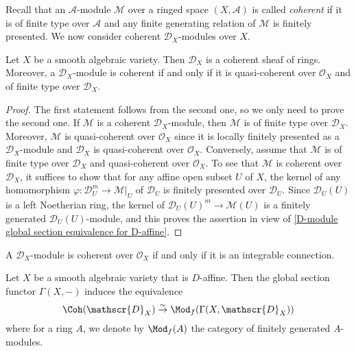 Recall that an $\mathscr{A}$-module $\mathscr{M}$ over a ringed space $(X,\mathscr{A})$ is called \textit{coherent} if it is of finite type over $\mathscr{A}$ and any finite generating relation of $\mathscr{M}$ is finitely presented. We now consider coherent $\mathscr{D}_X$-modules over $X$.
\begin{proposition}\label{D-module coherent D_X-module iff qcoh and ft}
Let $X$ be a smooth algebraic variety. Then $\mathscr{D}_X$ is a coherent sheaf of rings. Moreover, a $\mathscr{D}_X$-module is coherent if and only if it is quasi-coherent over $\mathscr{O}_X$ and of finite type over $\mathscr{D}_X$.
\end{proposition}
\begin{proof}
The first statement follows from the second one, so we only need to prove the second one. If $\mathscr{M}$ is a coherent $\mathscr{D}_X$-module, then $\mathscr{M}$ is of finite type over $\mathscr{D}_X$. Moreover, $\mathscr{M}$ is quasi-coherent over $\mathscr{O}_X$ since it is locally finitely presented as a $\mathscr{D}_X$-module and $\mathscr{D}_X$ is quasi-coherent over $\mathscr{O}_X$. Conversely, assume that $\mathscr{M}$ is of finite type over $\mathscr{D}_X$ and quasi-coherent over $\mathscr{O}_X$. To see that $\mathscr{M}$ is coherent over $\mathscr{D}_X$, it suffices to show that for any affine open subset $U$ of $X$, the kernel of any homomorphism $\varphi:\mathscr{D}_U^m\to\mathscr{M}|_U$ of $\mathscr{D}_U$ is finitely presented over $\mathscr{D}_U$. Since $\mathscr{D}_U(U)$ is a left Noetherian ring, the kernel of $\mathscr{D}_U(U)^m\to\mathscr{M}(U)$ is a finitely generated $\mathscr{D}_U(U)$-module, and this proves the assertion in view of \cref{D-module global section equivalence for D-affine}.
\end{proof}

\begin{theorem}\label{D-module coherent over O_X iff locally free}
A $\mathscr{D}_X$-module is coherent over $\mathscr{O}_X$ if and only if it is an integrable connection.
\end{theorem}

\begin{proposition}\label{D-module D-affine coherent equivalent to finite module}
Let $X$ be a smooth algebraic variety that is $D$-affine. Then the global section functor $\Gamma(X,-)$ induces the equivalence
\[\Coh(\mathscr{D}_X)\stackrel{\sim}{\to} \Mod_f(\Gamma(X,\mathscr{D}_X))\]
where for a ring $A$, we denote by $\Mod_f(A)$ the category of finitely generated $A$-modules.
\end{proposition}

